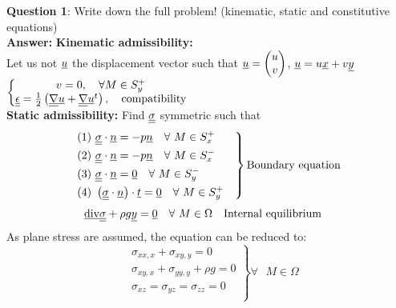\noindent \textbf{Question 1}: Write down the full problem! (kinematic, static and constitutive equations) \\

\textbf{Answer:} 
\textbf{Kinematic admissibility:}\\
Let us not $\underline{u}$ the displacement vector such that $\underline{u}=\left(\begin{matrix}
u \\ v
\end{matrix} \right) $, $\underline{u}=u\underline{x}+v \underline{y}$\\
$\left\lbrace \begin{matrix}
v=0, \quad \forall M \in S_y^+ \\
\underline{\underline{\epsilon}}=\frac{1}{2}\left( \underline{\underline{\nabla}}\underline{u} + \underline{\underline{\nabla}}\underline{u}^t\right), \quad \text{compatibility}
\end{matrix}\right.$
\\
\textbf{Static admissibility:}
Find $\underline{\underline{\sigma}} $ symmetric such that
\begin{equation}
\left. \begin{split}
& \text{(1)  } \underline{\underline{\sigma}} \cdot \underline{n} = -p\underline{n} \quad \forall \text{ } M \in S_x^+ \quad \\
& \text{(2)  } \underline{\underline{\sigma}} \cdot \underline{n} = -p\underline{n} \quad \forall \text{ } M \in S_x^- \quad \\
& \text{(3)  } \underline{\underline{\sigma}} \cdot \underline{n} = \underline{0} \quad \forall \text{ } M \in S_y^- \quad \\
& \text{(4)  } \left( \underline{\underline{\sigma}} \cdot \underline{n}\right) \cdot \underline{t} = \underline{0} \quad \forall \text{ } M \in S_y^+ \quad \\
\end{split} \right\rbrace \text{Boundary equation}
\end{equation}
\begin{equation}
\begin{split}
&  \text{\underline{div}} \underline{\underline{\sigma}} + \rho g\underline{y}= \underline{0} \quad \forall \text{ } M \in \Omega \quad \text{Internal equilibrium}
\end{split}
\end{equation}
As plane stress are assumed, the equation can be reduced to:
\begin{equation}
\left. \begin{split}
&  \sigma_{xx,x} + \sigma_{xy,y} = 0\\
&  \sigma_{xy,x} + \sigma_{yy,y} + \rho g = 0\\
&  \sigma_{xz} = \sigma_{yz} = \sigma_{zz} = 0\\
\end{split}\right\rbrace \forall \text{ } M \in \Omega
\end{equation}
